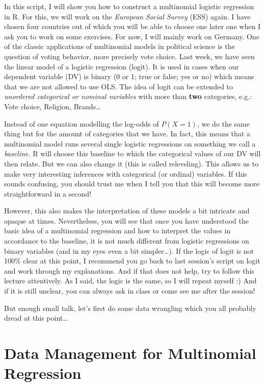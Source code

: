 \documentclass[
  letterpaper,
  DIV=11,
  numbers=noendperiod]{scrreprt}
\begin{document}
In this script, I will show you how to construct a multinomial logistic
regression in R. For this, we will work on the \emph{European Social
Survey} (ESS) again. I have chosen four countries out of which you will
be able to choose one later one when I ask you to work on some
exercises. For now, I will mainly work on Germany. One of the classic
applications of multinomial models in political science is the question
of voting behavior, more precisely vote choice. Last week, we have seen
the linear model of a logistic regression (logit). It is used in cases
when our dependent variable (DV) is binary (0 or 1; true or false; yes
or no) which means that we are not allowed to use OLS. The idea of logit
can be extended to \emph{unordered categorical or nominal variables}
with more than \textbf{two} categories, e.g.: Vote choice, Religion,
Brands\ldots{}

Instead of one equation modelling the log-odds of \(P(X=1)\), we do the
same thing but for the amount of categories that we have. In fact, this
means that a multinomial model runs several single logistic regressions
on something we call a \emph{baseline.} R will choose this baseline to
which the categorical values of our DV will then relate. But we can also
change it (this is called releveling). This allows us to make very
interesting inferences with categorical (or ordinal) variables. If this
sounds confusing, you should trust me when I tell you that this will
become more straightforward in a second!

However, this also makes the interpretation of these models a bit
intricate and opaque at times. Nevertheless, you will see that once you
have understood the basic idea of a multinomial regression and how to
interpret the values in accordance to the baseline, it is not much
different from logistic regressions on binary variables (and in my eyes
even a bit simpler\ldots). If the logic of logit is not 100\% clear at
this point, I recommend you go back to last session's script on logit
and work through my explanations. And if that does not help, try to
follow this lecture attentively. As I said, the logic is the same, so I
will repeat myself :) And if it is still unclear, you can always ask in
class or come see me after the session!

But enough small talk, let's first do some data wrangling which you all
probably dread at this point\ldots{}

\hypertarget{data-management-for-multinomial-regression}{%
\chapter{Data Management for Multinomial
Regression}\label{data-management-for-multinomial-regression}}
\end{document}

